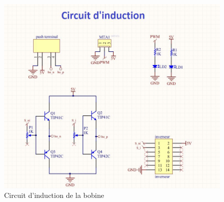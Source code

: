   \begin{figure}[H]
    \label{drive}
    \centering
    \includegraphics[scale=0.4]{resources/induction.jpg}
    \caption{Circuit d'induction de la bobine}
  \end{figure}
